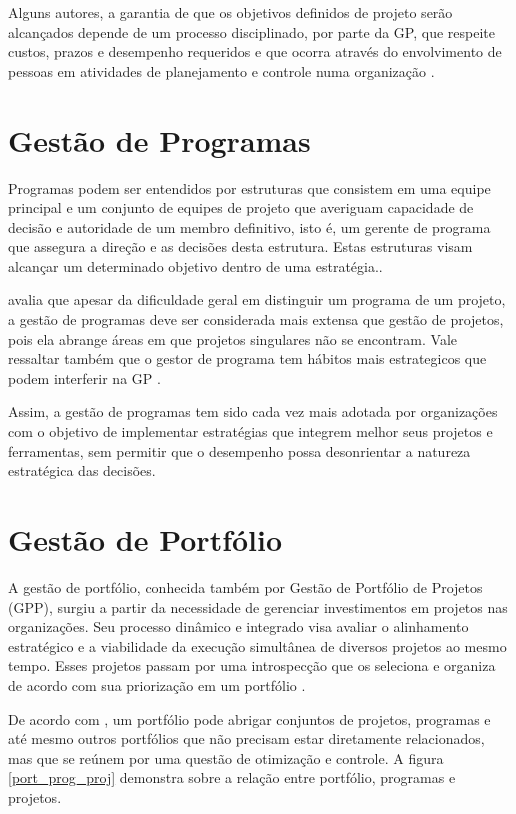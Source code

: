 Alguns autores, a garantia de que os objetivos definidos de projeto serão alcançados depende de um processo disciplinado, por parte da GP, que respeite custos, prazos e desempenho requeridos e que ocorra através do envolvimento de pessoas em atividades de planejamento e controle numa organização \cite{dinsmore2009ama, meredith2011project}.

\section{Gestão de Programas}

Programas podem ser entendidos por estruturas que consistem em uma equipe principal e um conjunto de equipes de projeto que averiguam capacidade de decisão e autoridade de um membro definitivo, isto é, um gerente de programa que assegura a direção e as decisões desta estrutura. Estas estruturas visam alcançar um determinado objetivo dentro de uma estratégia.\cite{brown2008handbook}.

 avalia que apesar da dificuldade geral em distinguir um programa de um projeto, a gestão de programas deve ser considerada mais extensa que gestão de projetos, pois ela abrange áreas em que projetos singulares não se encontram. Vale ressaltar também que o gestor de programa tem hábitos mais estrategicos que podem interferir na GP \cite{lycett2004289}.

Assim, a gestão de programas tem sido cada vez mais adotada por organizações com o objetivo de implementar estratégias que integrem melhor seus projetos e ferramentas, sem permitir que o desempenho possa desonrientar a natureza estratégica das decisões.


\section{Gestão de Portfólio}

A gestão de portfólio, conhecida também por Gestão de Portfólio de Projetos (GPP), surgiu a partir da necessidade de gerenciar investimentos em projetos nas organizações. Seu processo dinâmico e integrado visa avaliar o alinhamento estratégico e a viabilidade da execução simultânea de diversos projetos ao mesmo tempo. Esses projetos passam por uma introspecção que os seleciona e organiza de acordo com sua priorização em um portfólio \cite{meredith2011project, kerzner2013project}.

De acordo com , um portfólio pode abrigar conjuntos de projetos, programas e até mesmo outros portfólios que não precisam estar diretamente relacionados, mas que se reúnem por uma questão de otimização e controle. A figura \ref{port_prog_proj} demonstra sobre a relação entre portfólio, programas e projetos.

